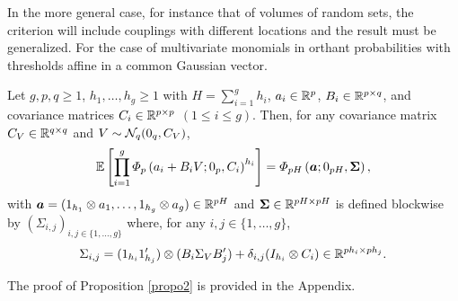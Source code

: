 \documentclass[aoas]{imsart}
\begin{document}
In the more general case, for instance that of volumes of random sets, the criterion will include couplings  with different locations and the result must be generalized. For the case of multivariate monomials in orthant probabilities with thresholds affine in a common Gaussian vector. 

\begin{propo}%
	\label{propo3}
	Let $g, p, q\geq 1$, $h_{1},\dots, h_{g}\geq 1$ with $H=\sum_{i=1}^g h_i$, $a_{i} \in \mathbb{R}^{p}$, $B_{i}\in \mathbb{R}^{p \times q}$, and covariance matrices $C_i \in \mathbb{R}^{p \times p}$ $(1\leq i \leq g)$. Then, for any covariance matrix $C_{V} \in \mathbb{R}^{q\times q}$ and $V\sim\mathcal{N}_{q}(0_q,C_{V})$, 
	\begin{equation}
	\mathbb{E}\left[ \prod_{i=1}^{g} \varPhi_{p}\left(a_i + B_{i}V;0_p, \covN_{i} \right)^{h_i} \right]
	=
	\varPhi_{p H}
	\left(
	\bm{a}
	;0_{pH},
	\mathbf{\Sigma}
	\right),
	\end{equation}
	with $\bm{a}=(1_{h_1}\otimes a_1, \dots, 1_{h_g}\otimes a_{g}) \in \mathbb{R}^{p H}$
	and $\mathbf{\Sigma}\in \mathbb{R}^{p H \times p H}$ is defined blockwise by $(\Sigma_{i,j})_{i,j \in \{1,\dots, g\}}$ where, for any $i,j \in \{1,\dots, g\}$, %
	\begin{equation}
	\Sigma_{i,j}=
	(1_{h_{i}}1_{h_{j}}')\otimes (B_{i}\Sigma_{V} B_{j}') + \delta_{i,j}(I_{h_{i}}\otimes \covN_{i}) \in \R^{p h_{i} \times p h_{j}}.
	\end{equation}
\end{propo}
The proof of Proposition \ref{propo2} is provided in the Appendix. 
\end{document}
